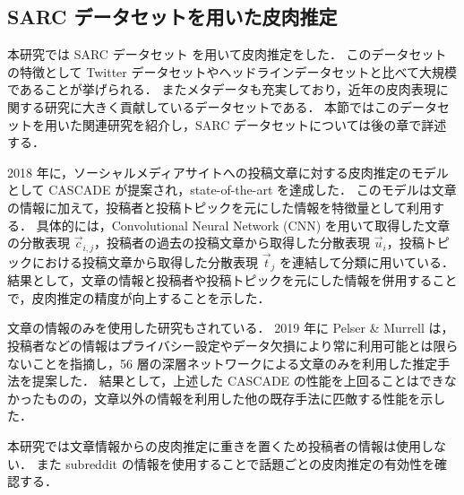 \subsection{SARC データセットを用いた皮肉推定}
本研究では SARC データセット \cite{khodak2018} を用いて皮肉推定をした．
このデータセットの特徴として Twitter データセットやヘッドラインデータセットと比べて大規模であることが挙げられる．
またメタデータも充実しており，近年の皮肉表現に関する研究に大きく貢献しているデータセットである．
本節ではこのデータセットを用いた関連研究を紹介し，SARC データセットについては後の章で詳述する．
\par


2018 年に，ソーシャルメディアサイトへの投稿文章に対する皮肉推定のモデルとして CASCADE \cite{hazarika-etal-2018-cascade} が提案され，state-of-the-art を達成した．
このモデルは文章の情報に加えて，投稿者と投稿トピックを元にした情報を特徴量として利用する．
具体的には，Convolutional Neural Network (CNN) を用いて取得した文章の分散表現 $\overrightarrow{c}_{i,j}$，投稿者の過去の投稿文章から取得した分散表現 $\overrightarrow{u}_{i}$，投稿トピックにおける投稿文章から取得した分散表現 $\overrightarrow{t}_{j}$ を連結して分類に用いている．
結果として，文章の情報と投稿者や投稿トピックを元にした情報を併用することで，皮肉推定の精度が向上することを示した．


\par
文章の情報のみを使用した研究もされている．
2019 年に Pelser \& Murrell \cite{pelser2019deep} は，投稿者などの情報はプライバシー設定やデータ欠損により常に利用可能とは限らないことを指摘し，56 層の深層ネットワークによる文章のみを利用した推定手法を提案した．
結果として，上述した CASCADE の性能を上回ることはできなかったものの，文章以外の情報を利用した他の既存手法に匹敵する性能を示した．


\par
本研究では文章情報からの皮肉推定に重きを置くため投稿者の情報は使用しない．
また subreddit の情報を使用することで話題ごとの皮肉推定の有効性を確認する．







